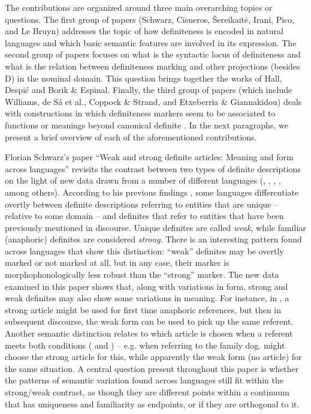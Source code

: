 \documentclass[output=paper]{langsci/langscibook}
\begin{document}
The contributions are organized around three main overarching topics or questions. The first group of papers (Schwarz, Cisneros, Šereikaitė, Irani, Pico, and Le Bruyn) addresses the topic of how definiteness is encoded in natural languages and which basic semantic features are involved in its expression. The second group of papers focuses on what is the syntactic locus of definiteness and what is the relation between definiteness marking and other projections (besides D) in the nominal domain. This question brings together the works of Hall, Despić and Borik \& Espinal.  Finally, the third group of papers (which include Williams, de Sá et al., Coppock \& Strand, and Etxeberria \& Giannakidou) deals with constructions in which definiteness markers seem to be associated to functions or meanings beyond canonical definite . In the next paragraphs, we present a brief overview of each of the aforementioned contributions.

Florian Schwarz’s paper “Weak and strong definite articles: Meaning and form across languages” revisits the contrast between two types of definite descriptions on the light of new data drawn from a number of different languages (, , , , among others). According to his previous findings \citep{Schwarz2009}, some languages differentiate overtly between definite descriptions referring to entities that are unique -- relative to some domain -- and definites that refer to entities that have been previously mentioned in discourse. Unique definites are called \textit{weak}, while familiar (anaphoric) definites are considered \textit{strong}. There is an interesting pattern found across languages that show this distinction: “weak” definites may be overtly marked or not marked at all, but in any case, their marker is morphophonologically less robust than the “strong” marker. The new data examined in this paper shows that, along with variations in form, strong and weak definites may also show some variations in meaning. For instance, in , a strong article might be used for first time anaphoric references, but then in subsequent discourse, the weak form can be used to pick up the same referent. Another semantic distinction relates to which article is chosen when a referent meets both conditions ( and ) -- e.g. when referring to the family dog.  might choose the strong article for this, while  apparently the weak form (no article) for the same situation. A central question present throughout this paper is whether the patterns of semantic variation found across languages still fit within the strong/weak contrast, as though they are different points within a continuum that has uniqueness and familiarity as endpoints, or if they are orthogonal to it. 
\end{document}
